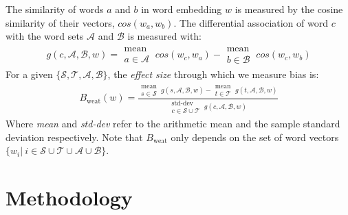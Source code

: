 \documentclass{article}
\begin{document}
The similarity of words $a$ and $b$ in word embedding $w$ is measured by the cosine similarity of their vectors, $cos(w_a, w_b)$.
The differential association of word $c$ with the word sets $\mathcal{A}$ and $\mathcal{B}$ is measured with:
\begin{align*}
g(c, \mathcal{A}, \mathcal{B}, w) = \substack{\text{mean} \\ a \in \mathcal{A}}\ cos(w_c, w_a) -  \substack{\text{mean} \\ b \in \mathcal{B}}\ cos(w_c, w_b)
\end{align*}
For a given $\{\mathcal{S}, \mathcal{T}, \mathcal{A}, \mathcal{B}\}$, the \textit{effect size} through which we measure bias is:
\begin{align}
B_{\text{weat}}(w) = \frac{ \substack{\text{mean} \\ s \in \mathcal{S}}\ g(s, \mathcal{A}, \mathcal{B}, w) - \substack{\text{mean} \\ t \in \mathcal{T}}\ g(t, \mathcal{A}, \mathcal{B}, w)}{ \substack{\text{std-dev} \\ c \in \mathcal{S} \cup \mathcal{T}}\ g(c, \mathcal{A}, \mathcal{B}, w)}
\end{align}
Where \textit{mean} and \textit{std-dev} refer to the arithmetic mean and the sample standard deviation respectively. 
Note that $B_{\text{weat}}$ only depends on the set of word vectors $\{w_i |\ i \in \mathcal{S} \cup \mathcal{T} \cup \mathcal{A} \cup \mathcal{B}\}.$


\section{Methodology}
\end{document}
